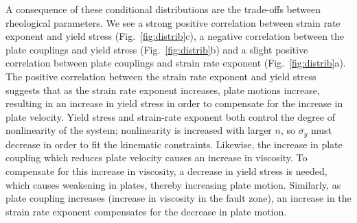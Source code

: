 \documentclass[12pt]{article}
\begin{document}
{A consequence of these conditional distributions are the trade-offs between rheological parameters. We see a strong positive correlation between strain rate exponent and yield stress (Fig.~\ref{fig:distrib}c), a negative correlation between the plate couplings and yield stress (Fig.~\ref{fig:distrib}b) and a slight positive correlation between plate couplings and strain rate exponent (Fig.~\ref{fig:distrib}a). The positive correlation between the strain rate exponent and yield stress suggests that as the strain rate exponent increases, plate motions increase, resulting in an increase in yield stress in order to compensate for the increase in plate velocity. 
Yield stress and strain-rate exponent both control the degree of nonlinearity of the system; nonlinearity is increased with larger $n$, so $\sigma_y$ must decrease in order to fit the kinematic constraints.
Likewise, the increase in plate coupling which reduces plate velocity causes an increase in viscosity.  To compensate for this increase in viscosity, a decrease in yield stress is needed, which causes weakening in plates, thereby increasing plate motion. Similarly, as plate coupling increases (increase in viscosity in the fault zone), an increase in the strain rate exponent compensates for the decrease in plate motion.  

}
\end{document}
